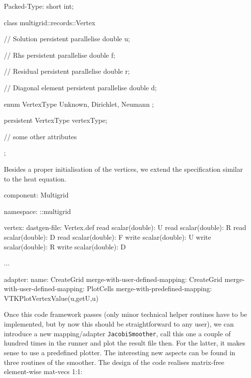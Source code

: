 \begin{code}
Packed-Type: short int;


class multigrid::records::Vertex {  
  // Solution
  persistent parallelise double  u;

  // Rhs
  persistent parallelise double  f;
  
  // Residual
  persistent parallelise double   r;

  // Diagonal element
  persistent parallelise double   d;
  
  enum VertexType {
    Unknown, Dirichlet, Neumann
  };
  
  persistent VertexType vertexType;
  
  // some other attributes
};
\end{code}

\noindent
Besides a proper initialisation of the vertices, we extend the specification
similar to the heat equation.
\begin{code}
component: Multigrid

namespace: ::multigrid

vertex:
  dastgen-file: Vertex.def
  read scalar(double): U
  read scalar(double): R
  read scalar(double): D
  read scalar(double): F
  write scalar(double): U
  write scalar(double): R
  write scalar(double): D
  
...

adapter:
  name: CreateGrid
  merge-with-user-defined-mapping: CreateGrid
  merge-with-user-defined-mapping: PlotCells
  merge-with-predefined-mapping: VTKPlotVertexValue(u,getU,u)
\end{code}

\noindent
Once this code framework passes (only minor technical helper routines have to
be implemented, but by now this should be straightforward to any user), we can
introduce a new mapping/adapter \texttt{JacobiSmoother}, call this one a couple of hundred times in the runner and plot the result file then. 
For the latter, it makes sense to use a predefined plotter.
The interesting new aspects can be found in three routines of the smoother.
The design of the code realises matrix-free element-wise mat-vecs 1:1: 


